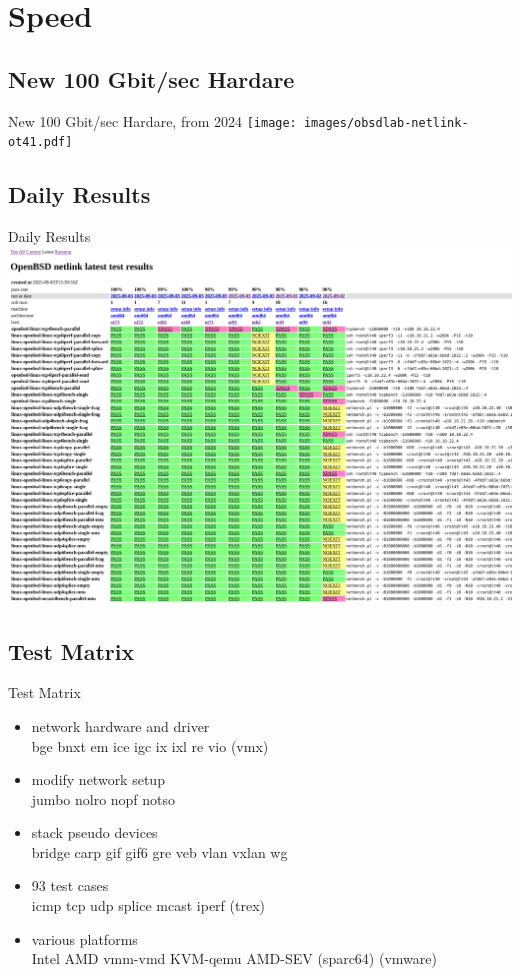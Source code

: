 \documentclass[14pt,aspectratio=169]{beamer}
\begin{document}
\section{Speed}

\subsection{New 100 Gbit/sec Hardare}
\begin{frame}{New 100 Gbit/sec Hardare, from 2024}
    \texttt{[image: images/obsdlab-netlink-ot41.pdf]}
\end{frame}

\subsection{Daily Results}
\begin{frame}{Daily Results}
    \includegraphics[height=0.8\textheight]{images/netlink-latest-chrome.pdf}
\end{frame}

\subsection{Test Matrix}
\begin{frame}{Test Matrix}
\begin{itemize}
    \item network hardware and driver\\
	bge bnxt em ice igc ix ixl re vio (vmx)
    \item modify network setup\\
	jumbo nolro nopf notso
    \item stack pseudo devices\\
	bridge carp gif gif6 gre veb vlan vxlan wg
    \item 93 test cases\\
	icmp tcp udp splice mcast iperf (trex)
    \item various platforms\\
	Intel AMD vmm-vmd KVM-qemu AMD-SEV (sparc64) (vmware)
\end{itemize}
\end{frame}
\end{document}
